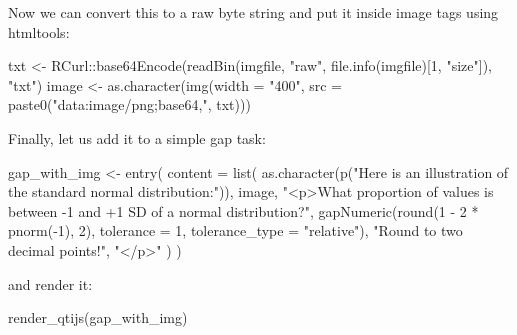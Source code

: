 \documentclass[twoside]{tufte-book}
\newenvironment{Shaded}{}{}
\newcommand{\AttributeTok}[1]{\textcolor[rgb]{0.49,0.56,0.16}{#1}}
\newcommand{\DecValTok}[1]{\textcolor[rgb]{0.25,0.63,0.44}{#1}}
\newcommand{\FunctionTok}[1]{\textcolor[rgb]{0.02,0.16,0.49}{#1}}
\newcommand{\NormalTok}[1]{#1}
\newcommand{\OtherTok}[1]{\textcolor[rgb]{0.00,0.44,0.13}{#1}}
\newcommand{\SpecialCharTok}[1]{\textcolor[rgb]{0.25,0.44,0.63}{#1}}
\newcommand{\StringTok}[1]{\textcolor[rgb]{0.25,0.44,0.63}{#1}}
\begin{document}
Now we can convert this to a raw byte string and put it inside image tags using htmltools:

\begin{Shaded}
\begin{Highlighting}[]
\NormalTok{txt }\OtherTok{\textless{}{-}}\NormalTok{ RCurl}\SpecialCharTok{::}\FunctionTok{base64Encode}\NormalTok{(}\FunctionTok{readBin}\NormalTok{(imgfile, }\StringTok{"raw"}\NormalTok{,}
                                   \FunctionTok{file.info}\NormalTok{(imgfile)[}\DecValTok{1}\NormalTok{, }\StringTok{"size"}\NormalTok{]),}
                           \StringTok{"txt"}\NormalTok{)}
\NormalTok{image }\OtherTok{\textless{}{-}} \FunctionTok{as.character}\NormalTok{(}\FunctionTok{img}\NormalTok{(}\AttributeTok{width =} \StringTok{"400"}\NormalTok{, }
                          \AttributeTok{src =} \FunctionTok{paste0}\NormalTok{(}\StringTok{"data:image/png;base64,"}\NormalTok{, txt)))}
\end{Highlighting}
\end{Shaded}

Finally, let us add it to a simple gap task:

\begin{Shaded}
\begin{Highlighting}[]
\NormalTok{gap\_with\_img }\OtherTok{\textless{}{-}} \FunctionTok{entry}\NormalTok{(}
  \AttributeTok{content =} \FunctionTok{list}\NormalTok{(}
    \FunctionTok{as.character}\NormalTok{(}\FunctionTok{p}\NormalTok{(}\StringTok{"Here is an illustration of the standard normal distribution:"}\NormalTok{)), }
\NormalTok{    image, }
    \StringTok{"\textless{}p\textgreater{}What proportion of values is between {-}1 and +1 SD of a normal distribution?"}\NormalTok{,}
    \FunctionTok{gapNumeric}\NormalTok{(}\FunctionTok{round}\NormalTok{(}\DecValTok{1} \SpecialCharTok{{-}} \DecValTok{2} \SpecialCharTok{*} \FunctionTok{pnorm}\NormalTok{(}\SpecialCharTok{{-}}\DecValTok{1}\NormalTok{), }\DecValTok{2}\NormalTok{), }\AttributeTok{tolerance =} \DecValTok{1}\NormalTok{, }
               \AttributeTok{tolerance\_type =} \StringTok{"relative"}\NormalTok{),}
    \StringTok{"Round to two decimal points!"}\NormalTok{,}
    \StringTok{"\textless{}/p\textgreater{}"}
\NormalTok{  )}
\NormalTok{)}
\end{Highlighting}
\end{Shaded}

and render it:

\begin{Shaded}
\begin{Highlighting}[]
\FunctionTok{render\_qtijs}\NormalTok{(gap\_with\_img)}
\end{Highlighting}
\end{Shaded}
\end{document}
